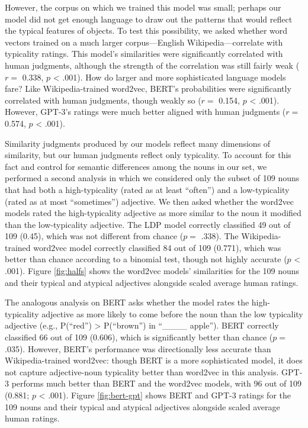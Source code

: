 \documentclass{ucetd}
\begin{document}
However, the corpus on which we trained this model was small; perhaps
our model did not get enough language to draw out the patterns that
would reflect the typical features of objects. To test this possibility,
we asked whether word vectors trained on a much larger corpus---English
Wikipedia---correlate with typicality ratings. This model's similarities
were significantly correlated with human judgments, although the
strength of the correlation was still fairly weak (\(r =\) 0.338, \(p\)
\textless{} .001). How do larger and more sophisticated language models
fare? Like Wikipedia-trained word2vec, BERT's probabilities were
significantly correlated with human judgments, though weakly so (\(r =\)
0.154, \(p\) \textless{} .001). However, GPT-3's ratings were much
better aligned with human judgments (\(r =\) 0.574, \(p\) \textless{}
.001).

Similarity judgments produced by our models reflect many dimensions of
similarity, but our human judgments reflect only typicality. To account
for this fact and control for semantic differences among the nouns in
our set, we performed a second analysis in which we considered only the
subset of 109 nouns that had both a high-typicality (rated as at least
``often'') and a low-typicality (rated as at most ``sometimes'')
adjective. We then asked whether the word2vec models rated the
high-typicality adjective as more similar to the noun it modified than
the low-typicality adjective. The LDP model correctly classified 49 out
of 109 (0.45), which was not different from chance (\(p =\) .338). The
Wikipedia-trained word2vec model correctly classified 84 out of 109
(0.771), which was better than chance according to a binomial test,
though not highly accurate (\(p\) \textless{} .001). Figure
\ref{fig:halfs} shows the word2vec models' similarities for the 109
nouns and their typical and atypical adjectives alongside scaled average
human ratings.

The analogous analysis on BERT asks whether the model rates the
high-typicality adjective as more likely to come before the noun than
the low typicality adjective (e.g., P(``red'') \textgreater{}
P(``brown'') in ``\_\_\_\_ apple''). BERT correctly classified 66 out of
109 (0.606), which is significantly better than chance (\(p =\) .035).
However, BERT's performance was directionally less accurate than
Wikipedia-trained word2vec: though BERT is a more sophisticated model,
it does not capture adjective-noun typicality better than word2vec in
this analysis. GPT-3 performs much better than BERT and the word2vec
models, with 96 out of 109 (0.881; \(p\) \textless{} .001). Figure
\ref{fig:bert-gpt} shows BERT and GPT-3 ratings for the 109 nouns and
their typical and atypical adjectives alongside scaled average human
ratings.
\end{document}
